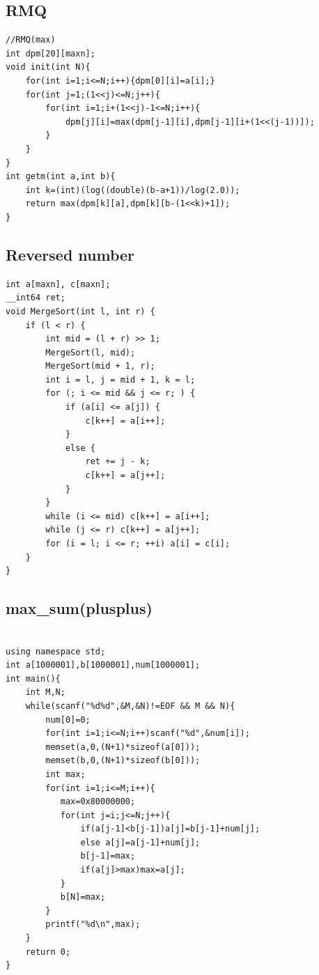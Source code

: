 \documentclass[a4paper]{article}
\begin{document}
\begin{CJK*}{UTF8}{gbsn}
\begin{multicols}{3}
\begin{flushleft}
\subsection{RMQ}
\begin{lstlisting}
//RMQ(max)
int dpm[20][maxn];
void init(int N){
    for(int i=1;i<=N;i++){dpm[0][i]=a[i];}
    for(int j=1;(1<<j)<=N;j++){
        for(int i=1;i+(1<<j)-1<=N;i++){
            dpm[j][i]=max(dpm[j-1][i],dpm[j-1][i+(1<<(j-1))]);
        }
    }
}
int getm(int a,int b){
    int k=(int)(log((double)(b-a+1))/log(2.0));
    return max(dpm[k][a],dpm[k][b-(1<<k)+1]);
}
\end{lstlisting}

\subsection{Reversed number}
\begin{lstlisting}
int a[maxn], c[maxn];
__int64 ret;
void MergeSort(int l, int r) {
    if (l < r) {
        int mid = (l + r) >> 1;
        MergeSort(l, mid);
        MergeSort(mid + 1, r);
        int i = l, j = mid + 1, k = l;
        for (; i <= mid && j <= r; ) {
            if (a[i] <= a[j]) {
                c[k++] = a[i++];
            }
            else {
                ret += j - k;
                c[k++] = a[j++];
            }
        }
        while (i <= mid) c[k++] = a[i++];
        while (j <= r) c[k++] = a[j++];
        for (i = l; i <= r; ++i) a[i] = c[i];
    }
}
\end{lstlisting}

\subsection{max\_sum(plusplus)}
\begin{lstlisting}

using namespace std;
int a[1000001],b[1000001],num[1000001];
int main(){
    int M,N;
    while(scanf("%d%d",&M,&N)!=EOF && M && N){
        num[0]=0;
        for(int i=1;i<=N;i++)scanf("%d",&num[i]);
        memset(a,0,(N+1)*sizeof(a[0]));
        memset(b,0,(N+1)*sizeof(b[0]));
        int max;
        for(int i=1;i<=M;i++){
           max=0x80000000;
           for(int j=i;j<=N;j++){
               if(a[j-1]<b[j-1])a[j]=b[j-1]+num[j];
               else a[j]=a[j-1]+num[j];
               b[j-1]=max;
               if(a[j]>max)max=a[j];
           }
           b[N]=max;
        }
        printf("%d\n",max);
    }
    return 0;
}
\end{lstlisting}


\end{flushleft}
\end{multicols}
\end{CJK*}
\end{document}
